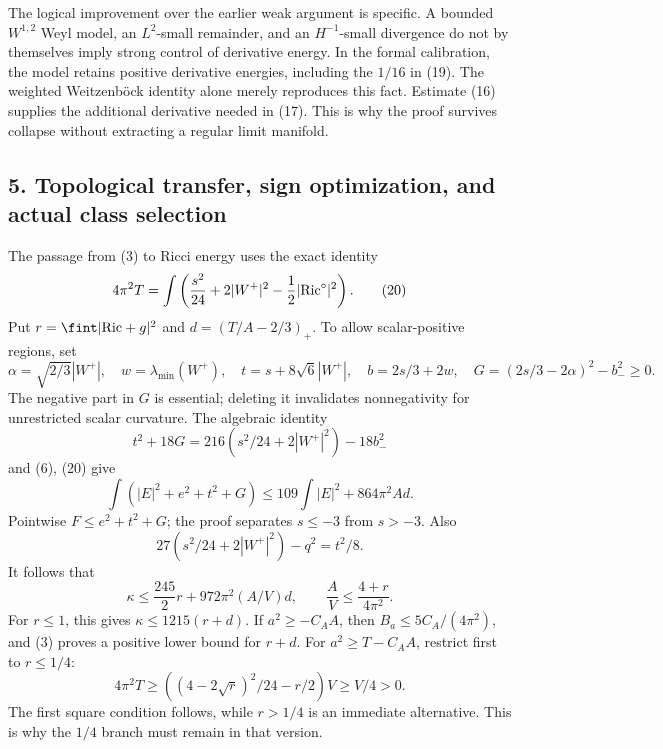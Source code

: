 \documentclass[
  english,
]{article}
\begin{document}
The logical improvement over the earlier weak argument is specific. A
bounded \(W^{1,2}\) Weyl model, an \(L^2\)-small remainder, and an
\(H^{-1}\)-small divergence do not by themselves imply strong control of
derivative energy. In the formal calibration, the model retains positive
derivative energies, including the \(1/16\) in (19). The weighted
Weitzenböck identity alone merely reproduces this fact. Estimate (16)
supplies the additional derivative needed in (17). This is why the proof
survives collapse without extracting a regular limit manifold.

\hypertarget{topological-transfer-sign-optimization-and-actual-class-selection}{%
\subsection{5. Topological transfer, sign optimization, and actual class
selection}\label{topological-transfer-sign-optimization-and-actual-class-selection}}

The passage from (3) to Ricci energy uses the exact identity \[
 4\pi^2T=\int\left(\frac{s^2}{24}+2|W^+|^2
                                      -\frac12|{\rm Ric}^{\circ}|^2\right).
                                                               \tag{20}
\] Put \(r=\fint|{\rm Ric}+g|^2\) and \(d=(T/A-2/3)_+\). To allow
scalar-positive regions, set \[
 \alpha=\sqrt{2/3}|W^+|,\quad w=\lambda_{\min}(W^+),\quad
 t=s+8\sqrt6|W^+|,\quad b=2s/3+2w,\quad
 G=(2s/3-2\alpha)^2-b_-^2\ge0 .
\] The negative part in \(G\) is essential; deleting it invalidates
nonnegativity for unrestricted scalar curvature. The algebraic identity
\[
 t^2+18G=216(s^2/24+2|W^+|^2)-18b_-^2
\] and (6), (20) give \[
 \int(|E|^2+e^2+t^2+G)
                    \le109\int|E|^2+864\pi^2Ad .
\] Pointwise \(F\le e^2+t^2+G\); the proof separates \(s\le-3\) from
\(s>-3\). Also \[
 27(s^2/24+2|W^+|^2)-q^2=t^2/8 .
\] It follows that \[
 \kappa\le\frac{245}{2}r+972\pi^2(A/V)d,\qquad
 \frac AV\le\frac{4+r}{4\pi^2}.
                                                               \tag{21}
\] For \(r\le1\), this gives \(\kappa\le1215(r+d)\). If \(a^2\ge-C_AA\),
then \(B_a\le5C_A/(4\pi^2)\), and (3) proves a positive lower bound for
\(r+d\). For \(a^2\ge T-C_AA\), restrict first to \(r\le1/4\): \[
 4\pi^2T\ge
       \left((4-2\sqrt r)^2/24-r/2\right)V\ge V/4>0.
\] The first square condition follows, while \(r>1/4\) is an immediate
alternative. This is why the \(1/4\) branch must remain in that version.
\end{document}
